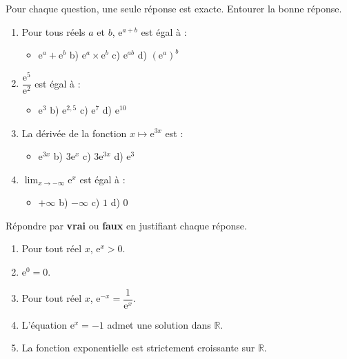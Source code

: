 \documentclass[11pt]{article}
\begin{document}
\begin{exercice}
Pour chaque question, une seule réponse est exacte. Entourer la bonne réponse.
\begin{enumerate}
\item Pour tous réels $a$ et $b$, $\mathrm{e}^{a+b}$ est égal à :
\begin{itemize}
\item[a)] $\mathrm{e}^{a}+\mathrm{e}^{b}$ \qquad b) $\mathrm{e}^{a}\times \mathrm{e}^{b}$ \qquad c) $\mathrm{e}^{ab}$ \qquad d) $(\mathrm{e}^{a})^{b}$
\end{itemize}
\item $\dfrac{\mathrm{e}^{5}}{\mathrm{e}^{2}}$ est égal à :
\begin{itemize}
\item[a)] $\mathrm{e}^{3}$ \qquad b) $\mathrm{e}^{2,5}$ \qquad c) $\mathrm{e}^{7}$ \qquad d) $\mathrm{e}^{10}$
\end{itemize}
\item La dérivée de la fonction $x\longmapsto \mathrm{e}^{3x}$ est :
\begin{itemize}
\item[a)] $\mathrm{e}^{3x}$ \qquad b) $3\mathrm{e}^{x}$ \qquad c) $3\mathrm{e}^{3x}$ \qquad d) $\mathrm{e}^{3}$
\end{itemize}
\item $\displaystyle\lim_{x\to -\infty}\mathrm{e}^{x}$ est égal à :
\begin{itemize}
\item[a)] $+\infty$ \qquad b) $-\infty$ \qquad c) $1$ \qquad d) $0$
\end{itemize}
\end{enumerate}
\end{exercice}

\begin{exercice}
Répondre par \textbf{vrai} ou \textbf{faux} en justifiant chaque réponse.
\begin{enumerate}
\item Pour tout réel $x$, $\mathrm{e}^{x}>0$.
\item $\mathrm{e}^{0}=0$.
\item Pour tout réel $x$, $\mathrm{e}^{-x}=\dfrac{1}{\mathrm{e}^{x}}$.
\item L'équation $\mathrm{e}^{x}=-1$ admet une solution dans $\mathbb{R}$.
\item La fonction exponentielle est strictement croissante sur $\mathbb{R}$.
\end{enumerate}
\end{exercice}
\end{document}
